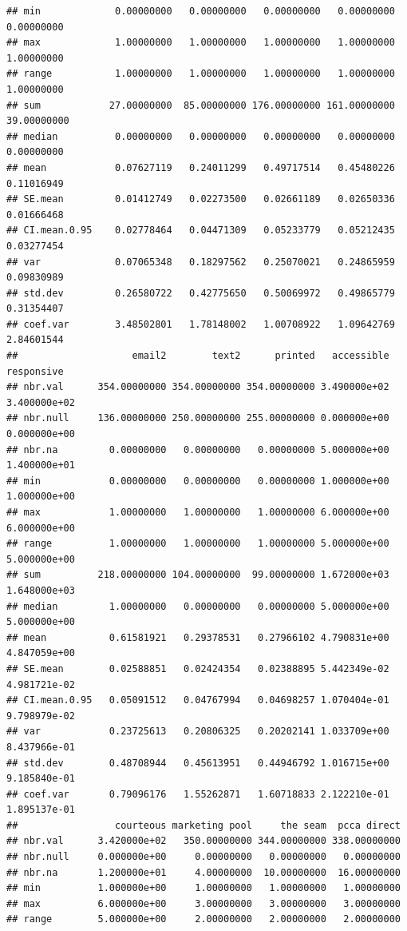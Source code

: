 \documentclass[
]{article}
\begin{document}
\begin{verbatim}
## min             0.00000000   0.00000000   0.00000000   0.00000000    0.00000000
## max             1.00000000   1.00000000   1.00000000   1.00000000    1.00000000
## range           1.00000000   1.00000000   1.00000000   1.00000000    1.00000000
## sum            27.00000000  85.00000000 176.00000000 161.00000000   39.00000000
## median          0.00000000   0.00000000   0.00000000   0.00000000    0.00000000
## mean            0.07627119   0.24011299   0.49717514   0.45480226    0.11016949
## SE.mean         0.01412749   0.02273500   0.02661189   0.02650336    0.01666468
## CI.mean.0.95    0.02778464   0.04471309   0.05233779   0.05212435    0.03277454
## var             0.07065348   0.18297562   0.25070021   0.24865959    0.09830989
## std.dev         0.26580722   0.42775650   0.50069972   0.49865779    0.31354407
## coef.var        3.48502801   1.78148002   1.00708922   1.09642769    2.84601544
##                    email2        text2      printed   accessible   responsive
## nbr.val      354.00000000 354.00000000 354.00000000 3.490000e+02 3.400000e+02
## nbr.null     136.00000000 250.00000000 255.00000000 0.000000e+00 0.000000e+00
## nbr.na         0.00000000   0.00000000   0.00000000 5.000000e+00 1.400000e+01
## min            0.00000000   0.00000000   0.00000000 1.000000e+00 1.000000e+00
## max            1.00000000   1.00000000   1.00000000 6.000000e+00 6.000000e+00
## range          1.00000000   1.00000000   1.00000000 5.000000e+00 5.000000e+00
## sum          218.00000000 104.00000000  99.00000000 1.672000e+03 1.648000e+03
## median         1.00000000   0.00000000   0.00000000 5.000000e+00 5.000000e+00
## mean           0.61581921   0.29378531   0.27966102 4.790831e+00 4.847059e+00
## SE.mean        0.02588851   0.02424354   0.02388895 5.442349e-02 4.981721e-02
## CI.mean.0.95   0.05091512   0.04767994   0.04698257 1.070404e-01 9.798979e-02
## var            0.23725613   0.20806325   0.20202141 1.033709e+00 8.437966e-01
## std.dev        0.48708944   0.45613951   0.44946792 1.016715e+00 9.185840e-01
## coef.var       0.79096176   1.55262871   1.60718833 2.122210e-01 1.895137e-01
##                 courteous marketing pool     the seam  pcca direct
## nbr.val      3.420000e+02   350.00000000 344.00000000 338.00000000
## nbr.null     0.000000e+00     0.00000000   0.00000000   0.00000000
## nbr.na       1.200000e+01     4.00000000  10.00000000  16.00000000
## min          1.000000e+00     1.00000000   1.00000000   1.00000000
## max          6.000000e+00     3.00000000   3.00000000   3.00000000
## range        5.000000e+00     2.00000000   2.00000000   2.00000000

\end{verbatim}
\end{document}
